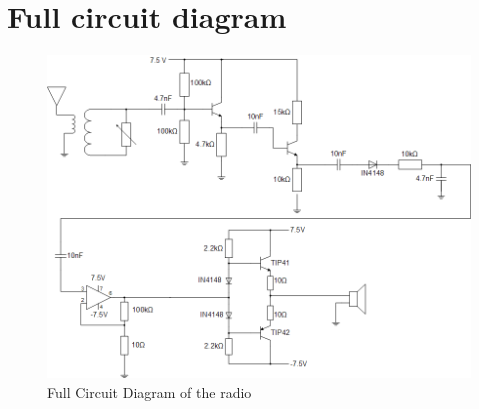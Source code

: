 \documentclass[a4paper,10pt]{report}
\begin{document}
\pagebreak
\section{Full circuit diagram}

\begin{figure}[b]
  \centering
  \includegraphics[scale=0.6, angle=90]{Circuit-diagram}
  \caption{Full Circuit Diagram of the radio}
\end{figure}
\end{document}
